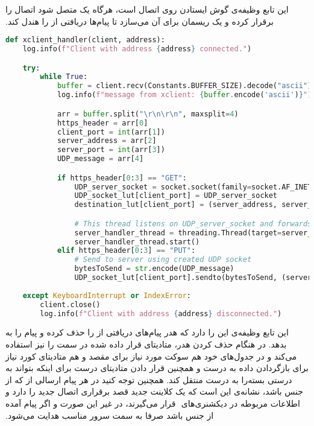 ‫این تابع وظیفه‌ی گوش ایستادن روی اتصال  است، هرگاه یک  متصل شود اتصال را برقرار کرده و یک ریسمان برای آن می‌سازد تا پیام‌ها دریافتی از  را هندل کند.
‫
\begin{latin}
\begin{lstlisting}[firstnumber=17, language=Python]
def xclient_handler(client, address):
	log.info(f"Client with address {address} connected.")

	try:
		while True:
			buffer = client.recv(Constants.BUFFER_SIZE).decode("ascii")
			log.info(f"message from xclient: {buffer.encode('ascii')}")

			arr = buffer.split("\r\n\r\n", maxsplit=4)
			https_header = arr[0]
			client_port = int(arr[1])
			server_address = arr[2]
			server_port = int(arr[3])
			UDP_message = arr[4]

			if https_header[0:3] == "GET":
				UDP_server_socket = socket.socket(family=socket.AF_INET, type=socket.SOCK_DGRAM)
				UDP_socket_lut[client_port] = UDP_server_socket
				destination_lut[client_port] = (server_address, server_port)

				# This thread listens on UDP_server_socket and forwards incomming packets to XCLIENT after adding header
				server_handler_thread = threading.Thread(target=server_handler, args=(client_port, ))
				server_handler_thread.start()
			elif https_header[0:3] == "PUT":
				# Send to server using created UDP socket
				bytesToSend = str.encode(UDP_message)
				UDP_socket_lut[client_port].sendto(bytesToSend, (server_address, server_port))
				
	except KeyboardInterrupt or IndexError:
		client.close()
		log.info(f"Client with address {address} disconnected.")

\end{lstlisting}
\end{latin}
‫
‫این تابع وظیفه‌ی این را دارد که هدر پیام‌های دریافتی از  را حذف کرده و پیام را به  بدهد. در هنگام حذف کردن هدر، متادیتای قرار داده شده در سمت  را نیز استفاده می‌کند و در جدول‌های  خود هم سوکت مورد نیاز برای مقصد و هم متادیتای کورد نیاز برای بازگردادن داده به  درست و همچنین قرار دادن متادیتای درست برای اینکه  بتواند به درستی بسته‌را به  درست منتقل کند. همچنین توجه کنید در هر پیام ارسالی از  که از جنس  باشد، نشانه‌ی این است که یک کلاینت جدید قصد برقراری اتصال جدید را دارد و اطلاعات مربوطه در دیکشنری‌های 
‫ قرار می‌گیرند، در غیر این صورت و اگر پیام آمده از جنس  باشد صرفا به سمت سرور مناسب هدایت می‌شود.
